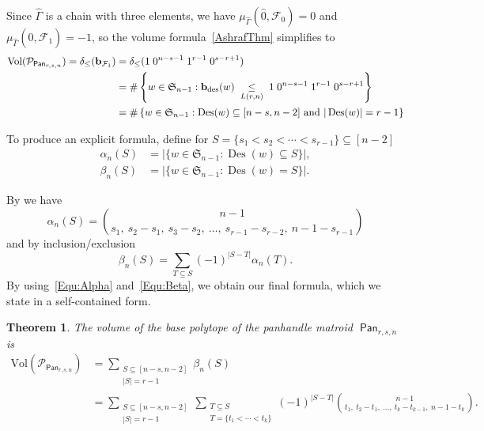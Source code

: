 \documentclass[11pt]{amsart}
\newtheorem{theorem}{Theorem}[section]
\theoremstyle{definition}
\newcommand{\0}{\emptyset}
\newcommand{\F}{\mathcal{F}}
\newcommand{\Po}{\mathcal{P}}
\newcommand{\Vol}{\mathrm{Vol}}
\DeclareMathOperator{\des}{des}
\DeclareMathOperator{\Des}{Des}
\DeclareMathOperator{\Pan}{\mathsf{Pan}} %
\newcommand{\Sym}{\mathfrak{S}}
\begin{document}
Since $\hat\Gamma$ is a chain with three elements, we have $\mu_{\hat\Gamma}(\hat0,\F_0)=0$ and
$\mu_{\hat\Gamma}(\hat0,\F_1)=-1$, so the volume formula~\eqref{AshrafThm} simplifies to
\begin{align}
\Vol(\Po_{\Pan_{r,s,n}}) = \delta_{\leq}(\bb_{\F_1})
&=\delta_{\leq}(1\; 0^{n-s-1}\; 1^{r-1}\; 0^{s-r+1}) \notag\\
&= \#\left\{w\in\Sym_{n-1} : \bb_{\des}(w) \; \underset{L(r,n)}{\leq}\; 1\; 0^{n-s-1}\; 1^{r-1}\; 0^{s-r+1} \right\}\notag\\
&= \#\left\{w\in\Sym_{n-1} : \Des(w)\subseteq[n-s,n-2] \text{ and } |\Des(w)|=r-1\right\}\label{volume-from-Des}
\end{align}

To produce an explicit formula, define for $S=\{s_1<s_2<\cdots<s_{r-1}\}\subseteq[n-2]$
\begin{equation} \label{alpha-beta}
\begin{aligned}
\alpha_n(S) &= |\{w\in\Sym_{n-1} : \Des(w) \subseteq S\}|,\\
\beta_n(S) &= |\{w\in\Sym_{n-1} : \Des(w)=S\}|.
\end{aligned}
\end{equation}

By \cite[Proposition~1.4.1]{Stanley} we have
\begin{equation} \label{Equ:Alpha}
\alpha_n(S)=
\binom{n-1}{s_1,\ s_2-s_1,\ s_3-s_2,\ \dots,\ s_{r-1}-s_{r-2},\ n-1-s_{r-1}}
\end{equation}
and by inclusion/exclusion
\begin{equation} \label{Equ:Beta}
\beta_n(S) = \sum_{T\subseteq S} (-1)^{|S-T|} \alpha_n(T).
\end{equation}
By using~\eqref{Equ:Alpha} and~\eqref{Equ:Beta}, we obtain our final formula, which we state in a self-contained form.

\begin{theorem}\label{thm:volofpan}
The volume of the base polytope of the panhandle matroid $\Pan_{r,s,n}$ is
\begin{align*}
\Vol(\Po_{\Pan_{r,s,n}})
&= \sum_{\substack{S \subseteq [n-s,n-2] \\ |S| = r-1}} \beta_n(S)\\
&= \sum_{\substack{S \subseteq [n-s,n-2] \\ |S| = r-1}} \sum_{\substack{T\subseteq S\\ T=\{t_1<\cdots<t_k\}}} (-1)^{|S-T|} \binom{n-1}{t_1,\ t_2-t_1,\ \dots,\ t_k-t_{k-1},\ n-1-t_k}.
\end{align*}
\end{theorem}
\end{document}
